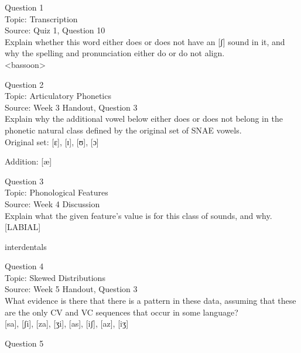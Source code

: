 \documentclass[12pt]{article}
\begin{document}
{\large Question 1}\\

Topic: Transcription\\
Source: Quiz 1, Question 10\\

Explain whether this word either does or does not have an [ʃ] sound in it, and why the spelling and pronunciation either do or do not align.\\

<bassoon>


\newpage

{\large Question 2}\\

Topic: Articulatory Phonetics\\
Source: Week 3 Handout, Question 3\\

Explain why the additional vowel below either does or does not belong in the phonetic natural class defined by the original set of SNAE vowels.\\

Original set: {[ɛ]}, {[ɪ]}, {[ʊ]}, {[ɔ]}

Addition: {[æ]}


\newpage

{\large Question 3}\\

Topic: Phonological Features\\
Source: Week 4 Discussion\\

Explain what the given feature’s value is for this class of sounds, and why.\\

{[LABIAL]}

interdentals


\newpage

{\large Question 4}\\

Topic: Skewed Distributions\\
Source: Week 5 Handout, Question 3\\

What evidence is there that there is a pattern in these data, assuming that these are the only CV and VC sequences that occur in some language?\\

{[sa]}, {[ʃi]}, {[za]}, {[ʒi]}, {[as]}, {[iʃ]}, {[az]}, {[iʒ]}


\newpage

{\large Question 5}\\
\end{document}
